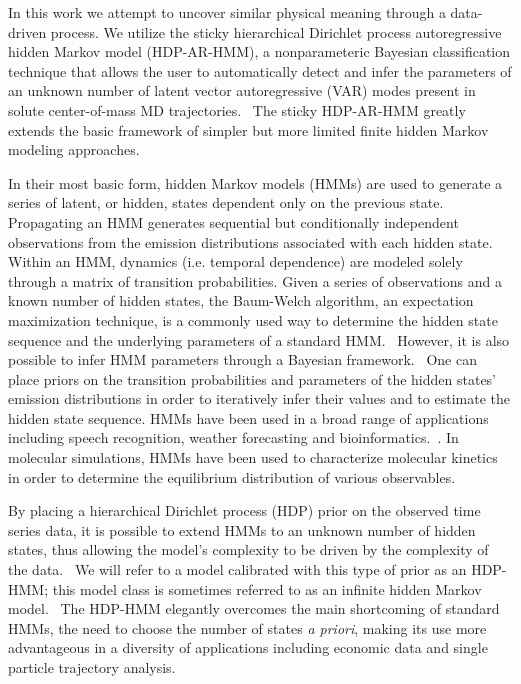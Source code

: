 \documentclass[journal=jpcbfk,manuscript=article]{achemso}
\begin{document}
  In this work we attempt to uncover similar physical meaning through a data-driven process. 
  We utilize the sticky hierarchical Dirichlet process autoregressive hidden Markov model 
  (HDP-AR-HMM), a nonparameteric Bayesian classification technique that allows the user to 
  automatically detect and infer the parameters of an unknown number of latent vector
  autoregressive (VAR) modes present in solute center-of-mass MD 
  trajectories.~\cite{fox_bayesian_2010} The sticky HDP-AR-HMM greatly extends the 
  basic framework of simpler but more limited finite hidden Markov modeling approaches.
    
  In their most basic form, hidden Markov models (HMMs) are used to generate
  a series of latent, or hidden, states dependent only on the previous state.~\cite{rabiner_tutorial_1989}
  Propagating an HMM generates sequential but conditionally independent observations from 
  the emission distributions associated with each hidden state. 
  Within an HMM, dynamics (i.e. temporal dependence) are modeled solely through  
  a matrix of transition probabilities. Given a series of observations and a known number of hidden states, the 
  Baum-Welch algorithm, an expectation maximization technique, is a commonly 
  used way to determine the hidden state sequence and the underlying parameters of
  a standard HMM.~\cite{baum_maximization_1970} However, it is also possible to infer
  HMM parameters through a Bayesian framework.~\cite{scott_bayesian_2002,jasra_markov_2005} 
  One can place priors on the transition probabilities and parameters of the hidden 
  states' emission distributions in order to iteratively infer their values and to
  estimate the hidden state sequence. HMMs have been used in a broad range of applications
  including speech recognition, weather forecasting and bioinformatics.~\cite{juang_hidden_1984,hughes_non-homogeneous_1999,yoon_hidden_2009}.
  In molecular simulations, HMMs have been used to characterize molecular kinetics
  in order to determine the equilibrium distribution of various observables.~\cite{thayer_hidden_2002,singhal_using_2004,noe_probability_2008,noe_projected_2013}
  
  By placing a hierarchical Dirichlet process (HDP) prior on the observed time
  series data, it is possible to extend HMMs to an unknown number of hidden
  states, thus allowing the model's complexity to be driven by the complexity
  of the data.~\cite{teh_hierarchical_2006} We will refer to a model calibrated with
  this type of prior as an HDP-HMM; this model class is sometimes referred to
  as an infinite hidden Markov model.~\cite{beal_infinite_2002} The HDP-HMM 
  elegantly overcomes the main shortcoming of standard HMMs, the need to choose
  the number of states \textit{a priori}, making its use more advantageous in
  a diversity of applications including economic data and single particle trajectory 
  analysis.~\cite{shi_identifying_2016,hines_analyzing_2015,sgouralis_introduction_2017,jazani_alternative_2019,wang_single-molecule_2014,persson_extracting_2013} 
\end{document}
